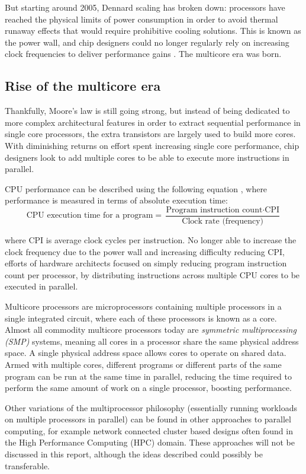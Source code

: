 \documentclass[bsc,frontabs,singlespacing,parskip,deptreport,normalheadings]{infthesis}
\begin{document}
But starting around 2005, Dennard scaling has broken down: processors have
reached the physical limits of power consumption in order to avoid thermal
runaway effects that would require prohibitive cooling solutions. This is known
as the power wall, and chip designers could no longer regularly rely on
increasing clock frequencies to deliver performance gains
\cite{parkhurst_single_2006}. The multicore era was born.

\subsection{Rise of the multicore era}

Thankfully, Moore's law is still going strong, but instead of being dedicated to
more complex architectural features in order to extract sequential performance
in single core processors, the extra transistors are largely used to build more
cores. With diminishing returns on effort spent increasing single core
performance, chip designers look to add multiple cores to be able to execute
more instructions in parallel.

CPU performance can be described using the following equation
\cite{patterson_computer_2021}, where performance is measured in terms of
absolute execution time: \[ \text{CPU execution time for a program} =
\frac{\text{Program instruction count} \cdot \text{CPI}}{\text{Clock rate
(frequency)}} \]

where CPI is average clock cycles per instruction. No longer able to increase
the clock frequency due to the power wall and increasing difficulty reducing
CPI, efforts of hardware architects focused on simply reducing program
instruction count per processor, by distributing instructions across multiple
CPU cores to be executed in parallel.

Multicore processors are microprocessors containing multiple processors in a
single integrated circuit, where each of these processors is known as a core.
Almost all commodity multicore processors today are \textit{symmetric
multiprocessing (SMP)} systems, meaning all cores in a processor share the same
physical address space. A single physical address space allows cores to operate
on shared data. Armed with multiple cores, different programs or different parts
of the same program can be run at the same time in parallel, reducing the time
required to perform the same amount of work on a single processor, boosting
performance.

Other variations of the multiprocessor philosophy (essentially running workloads
on multiple processors in parallel) can be found in other approaches to parallel
computing, for example network connected cluster based designs often found in
the High Performance Computing (HPC) domain. These approaches will not be
discussed in this report, although the ideas described could possibly be
transferable.
\end{document}
